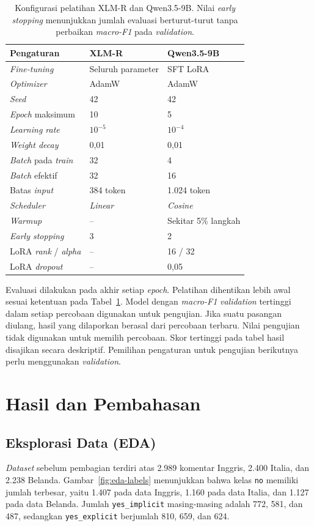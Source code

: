 \documentclass[11pt]{article}
\begin{document}
\begin{table}[t]
\centering
\small
\begin{tabular}{lll}
\toprule
Pengaturan & XLM-R & Qwen3.5-9B \\
\midrule
\textit{Fine-tuning} & Seluruh parameter & SFT LoRA \\
\textit{Optimizer} & AdamW & AdamW \\
\textit{Seed} & 42 & 42 \\
\textit{Epoch} maksimum & 10 & 5 \\
\textit{Learning rate} & $10^{-5}$ & $10^{-4}$ \\
\textit{Weight decay} & 0,01 & 0,01 \\
\textit{Batch} pada \textit{train} & 32 & 4 \\
\textit{Batch} efektif & 32 & 16 \\
Batas \textit{input} & 384 token & 1.024 token \\
\textit{Scheduler} & \textit{Linear} & \textit{Cosine} \\
\textit{Warmup} & -- & Sekitar 5\% langkah \\
\textit{Early stopping} & 3 & 2 \\
LoRA \textit{rank} / \textit{alpha} & -- & 16 / 32 \\
LoRA \textit{dropout} & -- & 0,05 \\
\bottomrule
\end{tabular}
\caption{Konfigurasi pelatihan XLM-R dan Qwen3.5-9B. Nilai \textit{early stopping} menunjukkan jumlah evaluasi berturut-turut tanpa perbaikan \textit{macro-F1} pada \textit{validation}.}
\label{tab:configuration}
\end{table}

Evaluasi dilakukan pada akhir setiap \textit{epoch}. Pelatihan dihentikan lebih awal sesuai ketentuan pada Tabel~\ref{tab:configuration}. Model dengan \textit{macro-F1} \textit{validation} tertinggi dalam setiap percobaan digunakan untuk pengujian. Jika suatu pasangan diulang, hasil yang dilaporkan berasal dari percobaan terbaru. Nilai pengujian tidak digunakan untuk memilih percobaan. Skor tertinggi pada tabel hasil disajikan secara deskriptif. Pemilihan pengaturan untuk pengujian berikutnya perlu menggunakan \textit{validation}.

\section{Hasil dan Pembahasan}
\subsection{Eksplorasi Data (EDA)}
\textit{Dataset} sebelum pembagian terdiri atas 2.989 komentar Inggris, 2.400 Italia, dan 2.238 Belanda. Gambar~\ref{fig:eda-labels} menunjukkan bahwa kelas \texttt{no} memiliki jumlah terbesar, yaitu 1.407 pada data Inggris, 1.160 pada data Italia, dan 1.127 pada data Belanda. Jumlah \texttt{yes\_implicit} masing-masing adalah 772, 581, dan 487, sedangkan \texttt{yes\_explicit} berjumlah 810, 659, dan 624.
\end{document}
